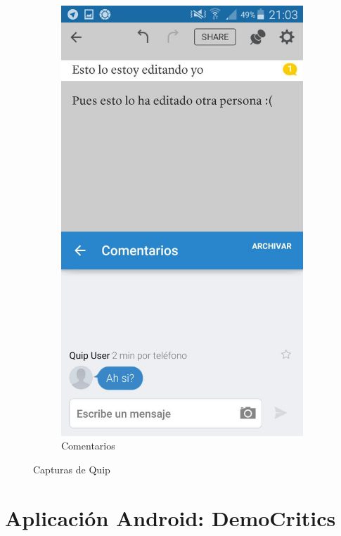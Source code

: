 \begin{figure}[H]
\begin{subfigure}[b]{0.3\textwidth}
                \includegraphics[width=\textwidth]{Media/Captures/quipComment.jpg}
                \caption{Comentarios}
                \label{fig:quipComments}
        \end{subfigure}
        \caption{Capturas de Quip}\label{fig:quipCaptures}
	\end{figure}
	
	

\section{Aplicación Android: DemoCritics}


